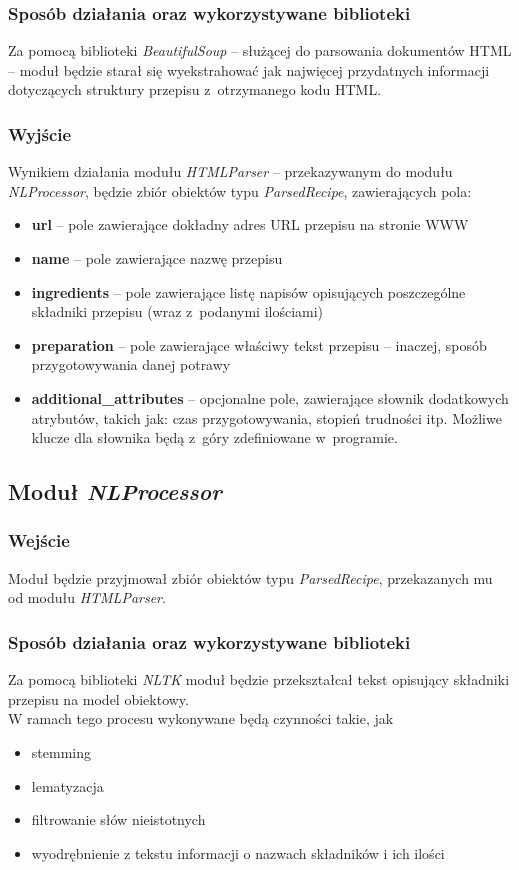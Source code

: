 \documentclass[11pt,a4paper]{article}
\begin{document}
\subsubsection{Sposób działania oraz wykorzystywane biblioteki}
Za pomocą biblioteki \textit{BeautifulSoup} -- służącej do parsowania dokumentów HTML -- moduł będzie starał się wyekstrahować jak najwięcej przydatnych informacji dotyczących struktury przepisu z~otrzymanego kodu HTML.
\subsubsection{Wyjście}
Wynikiem działania modułu \textit{HTMLParser} -- przekazywanym do modułu \textit{NLProcessor}, będzie zbiór obiektów typu \textit{ParsedRecipe}, zawierających pola:
\begin{itemize}
  \item \textbf{url} -- pole zawierające dokładny adres URL przepisu na stronie WWW
  \item \textbf{name} -- pole zawierające nazwę przepisu
  \item \textbf{ingredients} -- pole zawierające listę napisów opisujących poszczególne składniki przepisu (wraz z~podanymi ilościami)
  \item \textbf{preparation} -- pole zawierające właściwy tekst przepisu -- inaczej, sposób przygotowywania danej potrawy
  \item \textbf{additional\_attributes} -- opcjonalne pole, zawierające słownik dodatkowych atrybutów, takich jak: czas przygotowywania, stopień trudności itp. Możliwe klucze dla słownika będą z~góry zdefiniowane w~programie.
\end{itemize}

\newpage
\subsection{Moduł \textit{NLProcessor}}
\subsubsection{Wejście}
Moduł będzie przyjmował zbiór obiektów typu \textit{ParsedRecipe}, przekazanych mu od modułu \textit{HTMLParser}.
\subsubsection{Sposób działania oraz wykorzystywane biblioteki}
Za pomocą biblioteki \textit{NLTK} moduł będzie przekształcał tekst opisujący składniki przepisu na model obiektowy.\\ 
W ramach tego procesu wykonywane będą czynności takie, jak 
\begin{itemize}
	\item stemming
	\item lematyzacja 
	\item filtrowanie słów nieistotnych
	\item wyodrębnienie z tekstu informacji o nazwach składników i ich ilości
\end{itemize}
\end{document}

